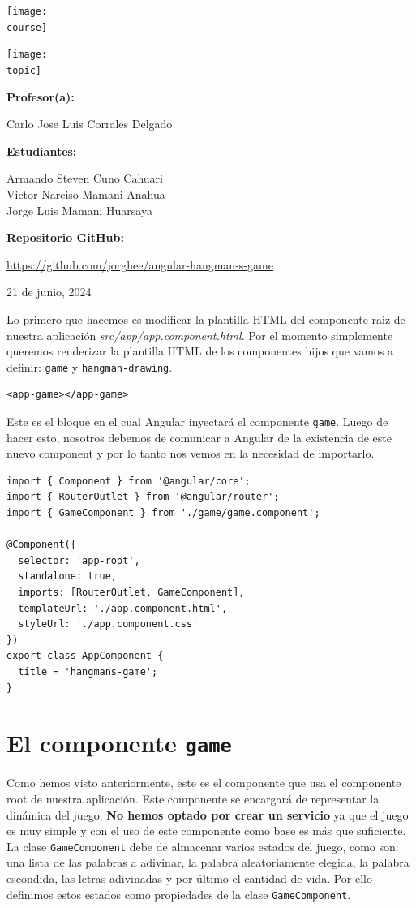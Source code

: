 \documentclass[10pt, a4paper]{article}
\newcommand{\mts}[1]{\texttt{#1}}
\newcommand{\course}{img/web_programming.png}
\newcommand{\topic}{img/angular.png}
\newcommand{\professor}{Carlo Jose Luis Corrales Delgado}
\newcommand{\students}{Armando Steven Cuno Cahuari\\Victor Narciso Mamani Anahua\\Jorge Luis Mamani Huarsaya}
\newcommand{\github}{https://github.com/jorghee/angular-hangman-s-game}
\newcommand{\mydate}{21 de junio, 2024}
\begin{document}
\begin{titlepage}
	\centering
	\texttt{[image: \\course]} \par
  \vfill \vfill
	\texttt{[image: \\topic]}\par
  \vfill \vfill
  {\textbf{Profesor(a):} \par}
	\professor \vfill
  {\textbf{Estudiantes:} \par}
	\students \vfill
  {\textbf{Repositorio GitHub:} \par}
  \href{\github}{\github} \vfill
	{\large \mydate \par}
\end{titlepage}

Lo primero que hacemos es modificar la plantilla HTML del componente raiz de nuestra aplicación 
\textit{src/app/app.component.html}. Por el momento simplemente queremos renderizar la plantilla 
HTML de los componentes hijos que vamos a definir: \mts{game} y \mts{hangman-drawing}.

\begin{verbatim}
<app-game></app-game>
\end{verbatim}

Este es el bloque en el cual Angular inyectará el componente \mts{game}. Luego de hacer esto, nosotros debemos de comunicar a Angular de la existencia de este nuevo component y por lo tanto nos vemos en la necesidad de importarlo.

\begin{verbatim}
import { Component } from '@angular/core';
import { RouterOutlet } from '@angular/router';
import { GameComponent } from './game/game.component';

@Component({
  selector: 'app-root',
  standalone: true,
  imports: [RouterOutlet, GameComponent],
  templateUrl: './app.component.html',
  styleUrl: './app.component.css'
})
export class AppComponent {
  title = 'hangmans-game';
}
\end{verbatim}

\section{El componente \mts{game}}
Como hemos visto anteriormente, este es el componente que usa el componente root de nuestra aplicación. Este componente se encargará de representar la dinámica del juego. \textbf{No hemos optado por crear un servicio} ya que el juego es muy simple y con el uso de este componente como base es más que suficiente.
\singlespacing
La clase \mts{GameComponent} debe de almacenar varios estados del juego, como son: una lista de las palabras a adivinar, la palabra aleatoriamente elegida, la palabra escondida, las letras adivinadas y por último el cantidad de vida. Por ello definimos estos estados como propiedades de la clase \mts{GameComponent}.
\end{document}
